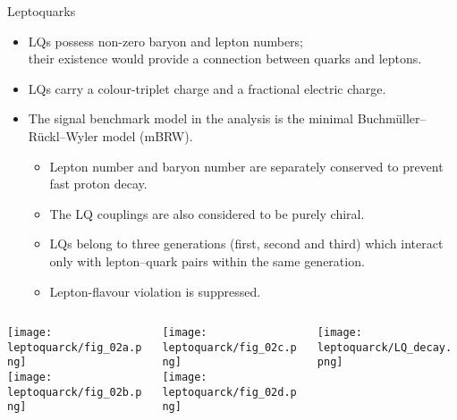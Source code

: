 \documentclass[8pt]{beamer}
\begin{document}
\begin{frame}{\large Leptoquarks}
  
  \begin{itemize}
   \item LQs possess non-zero baryon and lepton numbers; \\their existence would provide a connection between quarks and leptons.
   \item LQs carry a colour-triplet charge and a fractional electric charge.
   \item The signal benchmark model in the analysis is the minimal Buchm\"uller--R\"uckl--Wyler model (mBRW).
   \begin{itemize}
    \item Lepton number and baryon number are separately conserved to prevent fast proton decay.
    \item The LQ couplings are also considered to be purely chiral.
    \item LQs belong to three generations (first, second and third) which interact only with lepton--quark pairs within the same generation.
    \item Lepton-flavour violation is suppressed.
   \end{itemize}
  \end{itemize}

  \begin{columns}
   \begin{column}{4cm}
    \texttt{[image: leptoquarck/fig\_02a.png]}\\
    \texttt{[image: leptoquarck/fig\_02b.png]}\\
   \end{column}
   \begin{column}{4cm}
    \texttt{[image: leptoquarck/fig\_02c.png]}\\
    \texttt{[image: leptoquarck/fig\_02d.png]}\\
   \end{column}
   \begin{column}{4cm}
    \texttt{[image: leptoquarck/LQ\_decay.png]}\\
   \end{column}
  \end{columns}

\end{frame}
\end{document}
